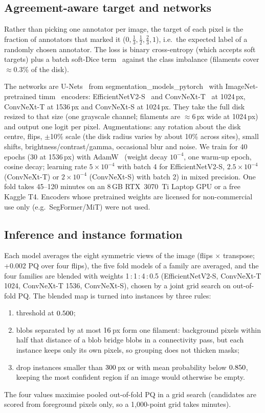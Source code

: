 \documentclass[sigconf]{acmart}
\begin{document}
\subsection{Agreement-aware target and networks}
Rather than picking one annotator per image, the target of each pixel is the fraction of annotators that marked it ($0,\tfrac13,\tfrac12,\tfrac23,1$), i.e.\ the expected label of a randomly chosen annotator. The loss is binary cross-entropy (which accepts soft targets) plus a batch soft-Dice term~\cite{milletari2016vnet} against the class imbalance (filaments cover $\approx$0.3\% of the disk).

The networks are U-Nets~\cite{ronneberger2015unet} from segmentation\_models\_pytorch~\cite{iakubovskii2019smp} with ImageNet-pretrained timm~\cite{wightman2019timm} encoders: EfficientNetV2-S~\cite{tan2021efficientnetv2} and ConvNeXt-T~\cite{liu2022convnext} at 1024\,px, ConvNeXt-T at 1536\,px and ConvNeXt-S at 1024\,px. They take the full disk resized to that size (one grayscale channel; filaments are $\approx$6\,px wide at 1024\,px) and output one logit per pixel. Augmentations: any rotation about the disk centre, flips, $\pm$10\% scale (the disk radius varies by about 10\% across sites), small shifts, brightness/contrast/gamma, occasional blur and noise. We train for 40 epochs (30 at 1536\,px) with AdamW~\cite{loshchilov2019adamw} (weight decay $10^{-4}$, one warm-up epoch, cosine decay; learning rate $5\!\times\!10^{-4}$ with batch 4 for EfficientNetV2-S, $2.5\!\times\!10^{-4}$ (ConvNeXt-T) or $2\!\times\!10^{-4}$ (ConvNeXt-S) with batch 2) in mixed precision. One fold takes 45--120 minutes on an 8\,GB RTX~3070~Ti Laptop GPU or a free Kaggle T4. Encoders whose pretrained weights are licensed for non-commercial use only (e.g.\ SegFormer/MiT) were not used.

\subsection{Inference and instance formation}
Each model averages the eight symmetric views of the image (flips $\times$ transpose; +0.002 PQ over four flips), the five fold models of a family are averaged, and the four families are blended with weights 1\,:\,1\,:\,4\,:\,0.5 (EfficientNetV2-S, ConvNeXt-T 1024, ConvNeXt-T 1536, ConvNeXt-S), chosen by a joint grid search on out-of-fold PQ. The blended map is turned into instances by three rules:
\begin{enumerate}
\item threshold at $0.500$;
\item blobs separated by at most $16$\,px form one filament: background pixels within half that distance of a blob bridge blobs in a connectivity pass, but each instance keeps only its own pixels, so grouping does not thicken masks;
\item drop instances smaller than $300$\,px or with mean probability below $0.850$, keeping the most confident region if an image would otherwise be empty.
\end{enumerate}
The four values maximise pooled out-of-fold PQ in a grid search (candidates are scored from foreground pixels only, so a 1{,}000-point grid takes minutes).
\end{document}
